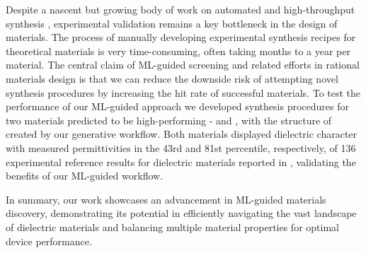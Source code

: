 \documentclass{article}
\newcommand{\CsTaTeO}[1][]{\ch{CsTaTeO6#1}}
\newcommand{\BiZrO}[1][]{\ch{Bi2Zr2O7#1}}
\begin{document}
Despite a nascent but growing body of work on automated and high-throughput synthesis \cite{king_rise_2011,bedard_reconfigurable_2018,steiner_organic_2019,burger_mobile_2020,szymanski_autonomous_2023,lunt_modular_2024}, experimental validation remains a key bottleneck in the design of materials.
The process of manually developing experimental synthesis recipes for theoretical materials is very time-consuming, often taking months to a year per material.
The central claim of ML-guided screening and related efforts in rational materials design is that we can reduce the downside risk of attempting novel synthesis procedures by increasing the hit rate of successful materials.
To test the performance of our ML-guided approach we developed synthesis procedures for two materials predicted to be high-performing - \BiZrO{} and \CsTaTeO{}, with the structure of \CsTaTeO{} created by our generative workflow.
Both materials displayed dielectric character with measured permittivities in the 43rd and 81st percentile, respectively, of 136 experimental reference results for dielectric materials reported in \cite{petousis_high-throughput_2017,petousis_benchmarking_2016}, validating the benefits of our ML-guided workflow.

In summary, our work showcases an advancement in ML-guided materials discovery, demonstrating its potential in efficiently navigating the vast landscape of dielectric materials and balancing multiple material properties for optimal device performance.


\end{document}
